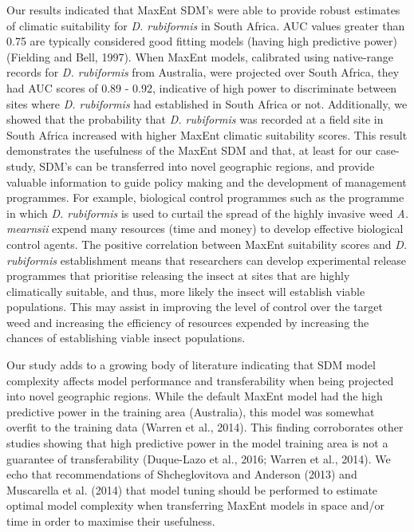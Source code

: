 \documentclass[12pt,]{article}
\begin{document}
Our results indicated that MaxEnt SDM's were able to provide robust
estimates of climatic suitability for \emph{D. rubiformis} in South
Africa. AUC values greater than 0.75 are typically considered good
fitting models (having high predictive power) (Fielding and Bell, 1997).
When MaxEnt models, calibrated using native-range records for \emph{D.
rubiformis} from Australia, were projected over South Africa, they had
AUC scores of 0.89 - 0.92, indicative of high power to discriminate
between sites where \emph{D. rubiformis} had established in South Africa
or not. Additionally, we showed that the probability that \emph{D.
rubiformis} was recorded at a field site in South Africa increased with
higher MaxEnt climatic suitability scores. This result demonstrates the
usefulness of the MaxEnt SDM and that, at least for our case-study,
SDM's can be transferred into novel geographic regions, and provide
valuable information to guide policy making and the development of
management programmes. For example, biological control programmes such
as the programme in which \emph{D. rubiformis} is used to curtail the
spread of the highly invasive weed \emph{A. mearnsii} expend many
resources (time and money) to develop effective biological control
agents. The positive correlation between MaxEnt suitability scores and
\emph{D. rubiformis} establishment means that researchers can develop
experimental release programmes that prioritise releasing the insect at
sites that are highly climatically suitable, and thus, more likely the
insect will establish viable populations. This may assist in improving
the level of control over the target weed and increasing the efficiency
of resources expended by increasing the chances of establishing viable
insect populations.

Our study adds to a growing body of literature indicating that SDM model
complexity affects model performance and transferability when being
projected into novel geographic regions. While the default MaxEnt model
had the high predictive power in the training area (Australia), this
model was somewhat overfit to the training data (Warren et al., 2014).
This finding corroborates other studies showing that high predictive
power in the model training area is not a guarantee of transferability
(Duque-Lazo et al., 2016; Warren et al., 2014). We echo that
recommendations of Shcheglovitova and Anderson (2013) and Muscarella et
al. (2014) that model tuning should be performed to estimate optimal
model complexity when transferring MaxEnt models in space and/or time in
order to maximise their usefulness.
\end{document}
